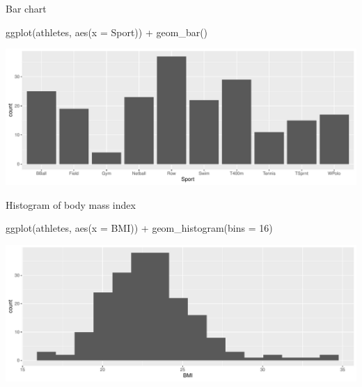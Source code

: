\documentclass[
  ignorenonframetext,
]{beamer}
\newenvironment{Shaded}{\begin{snugshade}}{\end{snugshade}}
\newcommand{\AttributeTok}[1]{\textcolor[rgb]{0.40,0.45,0.13}{#1}}
\newcommand{\DecValTok}[1]{\textcolor[rgb]{0.68,0.00,0.00}{#1}}
\newcommand{\FunctionTok}[1]{\textcolor[rgb]{0.28,0.35,0.67}{#1}}
\newcommand{\NormalTok}[1]{\textcolor[rgb]{0.00,0.23,0.31}{#1}}
\newcommand{\SpecialCharTok}[1]{\textcolor[rgb]{0.37,0.37,0.37}{#1}}
\begin{document}
\begin{frame}[fragile]{Bar chart}
\label{bar-chart}
\begin{Shaded}
\begin{Highlighting}[]
\FunctionTok{ggplot}\NormalTok{(athletes, }\FunctionTok{aes}\NormalTok{(}\AttributeTok{x =}\NormalTok{ Sport)) }\SpecialCharTok{+} \FunctionTok{geom\_bar}\NormalTok{()}
\end{Highlighting}
\end{Shaded}

\includegraphics{graphs_files/figure-beamer/graphs-R-4-1.pdf}
\end{frame}

\begin{frame}[fragile]{Histogram of body mass index}
\label{histogram-of-body-mass-index}
\begin{Shaded}
\begin{Highlighting}[]
\FunctionTok{ggplot}\NormalTok{(athletes, }\FunctionTok{aes}\NormalTok{(}\AttributeTok{x =}\NormalTok{ BMI)) }\SpecialCharTok{+} \FunctionTok{geom\_histogram}\NormalTok{(}\AttributeTok{bins =} \DecValTok{16}\NormalTok{)}
\end{Highlighting}
\end{Shaded}

\includegraphics{graphs_files/figure-beamer/graphs-R-5-1.pdf}
\end{frame}
\end{document}
